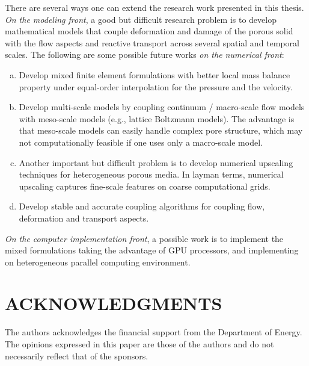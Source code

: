 \documentclass[11pt,reqno]{amsart}
\begin{document}
There are several ways one can extend the research work 
presented in this thesis. \emph{On the modeling front}, 
a good but difficult research problem is to develop 
mathematical models that couple deformation and damage 
of the porous solid with the flow aspects and reactive 
transport across several spatial and temporal scales. 
The following are some possible future works 
\emph{on the numerical front}: 
\begin{enumerate}[(a)]
\item Develop mixed finite element formulations with 
  better local mass balance property under equal-order 
  interpolation for the pressure and the velocity.
\item Develop multi-scale models by coupling continuum / 
  macro-scale flow models with meso-scale models (e.g., 
  lattice Boltzmann models). The advantage is that 
  meso-scale models can easily handle complex pore 
  structure, which may not computationally feasible 
  if one uses only a macro-scale model.  
\item Another important but difficult problem is 
  to develop numerical upscaling techniques for 
  heterogeneous porous media. In layman terms, 
  numerical upscaling captures fine-scale features 
  on coarse computational grids. 
\item Develop stable and accurate coupling algorithms 
  for coupling flow, deformation and transport aspects. 
\end{enumerate}  
\emph{On the computer implementation front}, a possible 
work is to implement the mixed formulations taking the 
advantage of GPU processors, and implementing on 
heterogeneous parallel computing environment.
 
\section*{ACKNOWLEDGMENTS}
The authors acknowledges the financial support from the Department of Energy. 
The opinions expressed in this paper are those of the authors and do not necessarily reflect that of the sponsors.



 
\end{document}
